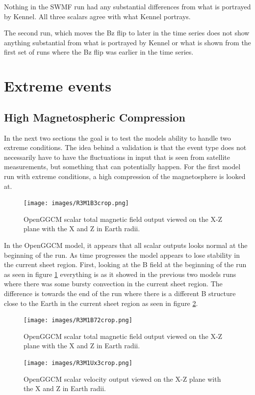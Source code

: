 Nothing in the SWMF run had any substantial differences from what is portrayed
by Kennel. All three scalars agree with what Kennel portrays.

The second run, which moves the Bz flip to later in the time series does not
show anything substantial from what is portrayed by Kennel or what is shown from
the first set of runs where the Bz flip was earlier in the time series.

\section{Extreme events}
\subsection{High Magnetospheric Compression}
In the next two sections the goal is to test the models ability to handle two
extreme conditions. The idea behind a  validation is that
the event type does not necessarily have to have the fluctuations in input that
is seen from satellite measurements, but something that can potentially happen.
For the first model run with extreme conditions, a high compression of the
magnetosphere is looked at.
\begin{figure}
	\centering
	\texttt{[image: images/R3M1B3crop.png]}
	\caption{OpenGGCM scalar total magnetic field output viewed on the X-Z plane
	with the X and Z in Earth radii. }
    \label{fig:R3M1B3crop}
	\figSpace
\end{figure}
In the OpenGGCM model, it appears that all scalar outputs looks normal at the
beginning of the run. As time progresses the model appears to lose stability in
the current sheet region. First, looking at the B field at the beginning of the
run as seen in figure \ref{fig:R3M1B3crop} everything is as it showed in the
previous two models runs where there was some bursty convection in the current sheet region.
The difference is towards the end of the run where there is a different B
structure close to the Earth in the current sheet region as seen in figure
\ref{fig:R3M1B72crop}.
\begin{figure}
	\centering
	\texttt{[image: images/R3M1B72crop.png]}
	\caption{OpenGGCM scalar total magnetic field output viewed on the X-Z plane
	with the X and Z in Earth radii. }
    \label{fig:R3M1B72crop}
	\figSpace
\end{figure}
\begin{figure}
	\centering
	\texttt{[image: images/R3M1Ux3crop.png]}
	\caption{OpenGGCM scalar velocity output viewed on the X-Z plane
	with the X and Z in Earth radii. }
    \label{fig:R3M1Ux3crop}
	\figSpace
\end{figure}
